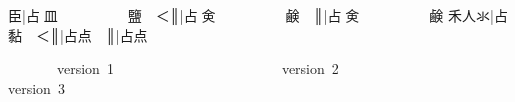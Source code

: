 {\cjk{}{\cnsym{}　　　　}臣}|{\cjk{}占{\cnxb{}𠂭}皿{\cnsym{}　　　　　}鹽{\cnsym{}　}＜}║{\cjk{}{\cnsym{}　　　　　　　}}|{\cjk{}占{\cnxb{}𠂭}{\cnxa{}㑒}{\cnsym{}　　　　　}鹸{\cnsym{}　}}║{\cjk{}{\cnsym{}　　　　　　　　}}|{\cjk{}占{\cnxb{}𠂭}{\cnxa{}㑒}{\cnsym{}　　　　　}鹸} 
{\cjk{}{\cnsym{}　　　}禾人氺}|{\cjk{}占{\cnsym{}　　　　　　　}黏{\cnsym{}　}＜}║{\cjk{}{\cnsym{}　　　　　　　}}|{\cjk{}占点{\cnsym{}　}}║{\cjk{}{\cnsym{}　　　　　　　　}}|{\cjk{}占点} 
\endgroup{}{}

\endgroup{}\begin{multicols}{2}\end{multicols}\begingroup\mktsObeyAllLines{}

\begingroup\mktsStyleCode{}       version 1                        version 2                        version 3

